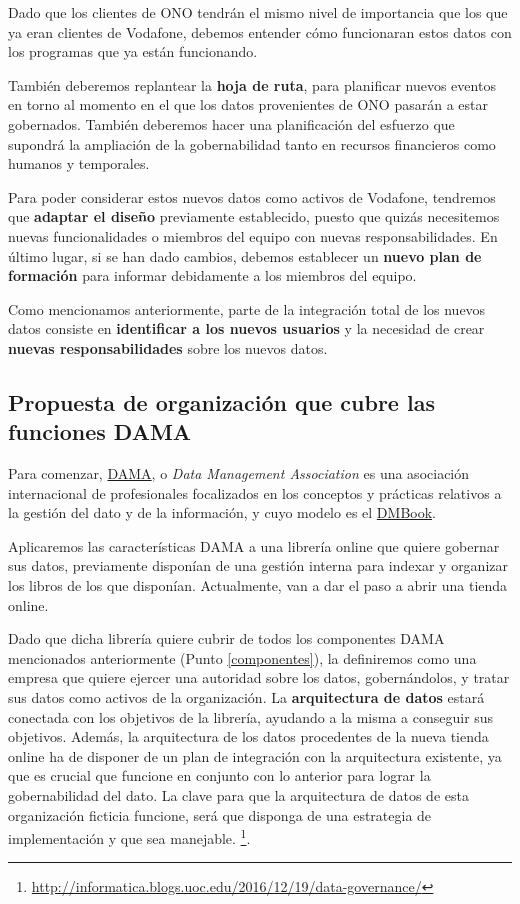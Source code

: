 \documentclass{article}
\begin{document}
Dado que los clientes de ONO tendrán el mismo nivel de importancia que los que ya eran clientes de Vodafone, debemos entender cómo funcionaran estos datos con los programas que ya están funcionando.

También deberemos replantear la \textbf{hoja de ruta}, para planificar nuevos eventos en torno al momento en el que los datos provenientes de ONO pasarán a estar gobernados. También deberemos hacer una planificación del esfuerzo que supondrá la ampliación de la gobernabilidad tanto en recursos financieros como humanos y temporales.

Para poder considerar estos nuevos datos como activos de Vodafone, tendremos que \textbf{adaptar el diseño} previamente establecido, puesto que quizás necesitemos nuevas funcionalidades o miembros del equipo con nuevas responsabilidades. En último lugar, si se han dado cambios, debemos establecer un \textbf{nuevo plan de formación} para informar debidamente a los miembros del equipo.

Como  mencionamos anteriormente, parte de la integración total de los nuevos datos consiste en \textbf{identificar a los nuevos usuarios} y la necesidad de crear \textbf{nuevas responsabilidades} sobre los nuevos datos.


\subsection{Propuesta de organización que cubre las funciones DAMA}
Para comenzar, \href{https://dama.org/}{DAMA}, o \textit{Data Management Association} es una asociación internacional de profesionales focalizados en los conceptos y prácticas relativos a la gestión del dato y de la información, y cuyo modelo es el  \href{https://dama.org/content/body-knowledge}{DMBook}. 

Aplicaremos las características DAMA a una librería online que quiere gobernar sus datos, previamente disponían de una gestión interna para indexar y organizar los libros de los que disponían. Actualmente, van a dar el paso a abrir una tienda online.

Dado que dicha librería quiere cubrir de todos los componentes DAMA mencionados anteriormente (Punto \ref{componentes}), la definiremos como una empresa que quiere ejercer una autoridad sobre los datos, gobernándolos, y tratar sus datos como activos de la organización. La \textbf{arquitectura de datos} estará conectada con los objetivos de la librería, ayudando a la misma a conseguir sus objetivos. Además, la arquitectura de los datos procedentes de la nueva tienda online ha de disponer de un plan de integración con la arquitectura existente, ya que es crucial que funcione en conjunto con lo anterior para lograr la gobernabilidad del dato.
La clave para que la arquitectura de datos de esta organización ficticia funcione, será que disponga de una estrategia de implementación y que sea manejable. \footnote{\url{http://informatica.blogs.uoc.edu/2016/12/19/data-governance/}}.
\end{document}

